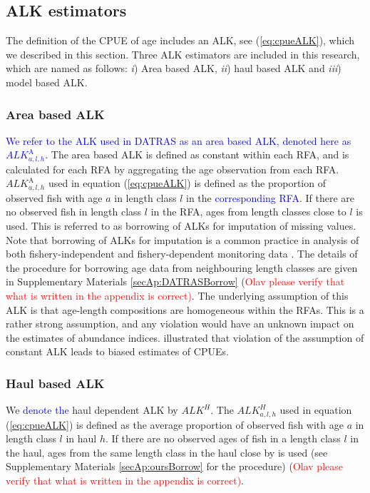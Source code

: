 \documentclass[a4paper 12pt]{article}
\numberwithin{equation}{section}
\newcommand{\ed}[1]{\textcolor{red}{#1}}
\newcommand{\nat}[1]{\textcolor{blue}{#1}}
\begin{document}
\subsection{ALK estimators}
\label{sec:alkmethods}
The definition of the CPUE of age includes an ALK, see (\ref{eq:cpueALK}), which we described in this section. Three ALK estimators are included in this research, which are named as follows:  \textit{i}) Area based ALK, \textit{ii}) haul based ALK and \textit{iii}) model based ALK.
\subsubsection{Area based ALK}
\label{sec:datrasalkestimator}

\nat{We refer to the ALK used in DATRAS  as an area based ALK, denoted here as $ALK^{\text{A}}_{a,l,h}$}. The area based ALK is defined as constant within each RFA, and is calculated for each RFA by aggregating the age observation from each RFA. $ALK^{\text{A}}_{a,l,h}$ used in equation (\ref{eq:cpueALK}) is defined as the proportion of observed fish with age $a$ in length class $l$ in the \nat{corresponding RFA}. If there are no observed fish in length class $l$ in the RFA, ages from length classes close to $l$ is used. This is referred to as borrowing of ALKs for imputation of missing values. Note that borrowing of ALKs for imputation is a common practice in analysis of both fishery-independent and fishery-dependent monitoring data \citep[see for example,][]{aanes2015efficient,catchpole2017challenges}. The details of the procedure for borrowing age data from neighbouring length classes are given in Supplementary Materials \ref{secAp:DATRASBorrow} (\ed{Olav please verify that what is written in the appendix is correct)}.  The underlying assumption of this ALK  is that age-length compositions are homogeneous within the RFAs. This is a rather strong assumption, and any violation would have an unknown impact on the estimates of abundance indices. \citet{aanes2015efficient} illustrated that violation of the assumption of constant ALK leads to biased estimates of CPUEs. 

\subsubsection{Haul based ALK}
\label{sec:haulestimator}
We \nat{denote the} haul dependent ALK  by  $ALK^{H}$. The $ALK^{H}_{a,l,h}$  used in equation (\ref{eq:cpueALK}) is defined as the average proportion of observed fish with age $a$ in  length class $l$ in haul $h$. If there are no observed ages of fish in a length class $l$ in the haul, ages from the same length class in the haul close by is used (see Supplementary Materials \ref{secAp:oursBorrow} for the procedure) (\ed{Olav please verify that what is written in the appendix is correct)}. 
\end{document}
